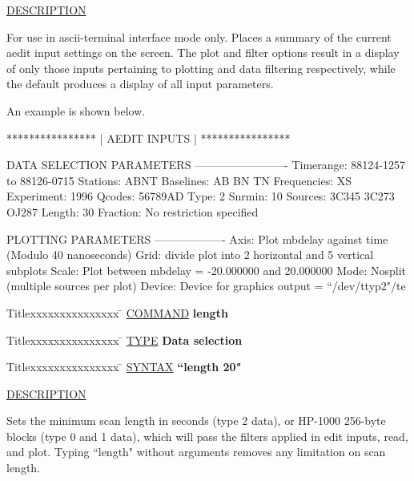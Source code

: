 \underline{DESCRIPTION}
\begin{list}{}{\setlength{\leftmargin}{0.5in}
     \setlength{\rightmargin}{0in}}
\item
For use in ascii-terminal interface mode only.  Places a
summary of the current aedit input settings on the screen.
The plot and filter options result in a display of only 
those inputs pertaining to plotting and data filtering
respectively, while the default produces a display of all
input parameters.
\item
An example is shown below.
\item
	****************
	| AEDIT INPUTS |
	****************
\item
DATA SELECTION PARAMETERS
-------------------------
Timerange:   88124-1257 to  88126-0715
Stations:    ABNT
Baselines:   AB BN TN 
Frequencies: XS
Experiment:  1996
Qcodes:      56789AD
Type:        2
Snrmin:      10
Sources:     3C345 3C273 OJ287
Length:      30 
Fraction:    No restriction specified
\item
PLOTTING PARAMETERS
-------------------
Axis:        Plot mbdelay against time (Modulo 40 nanoseconds)
Grid:        divide plot into 2 horizontal and 5 vertical subplots
Scale:       Plot between mbdelay = -20.000000 and 20.000000
Mode:        Nosplit (multiple sources per plot)
Device:      Device for graphics output = ``/dev/ttyp2"/te
\item
\end{list}
\vspace{.2in}

\begin{tabbing}
Titlexxxxxxxxxxxxxxx \= \kill
\underline{COMMAND} \> {\bf 	length} \\
\end{tabbing}

\begin{tabbing}
Titlexxxxxxxxxxxxxxx \= \kill
\underline{TYPE} \> {\bf 		Data selection} \\
\end{tabbing}

\begin{tabbing}
Titlexxxxxxxxxxxxxxx \= \kill
\underline{SYNTAX} \> {\bf 		``length 20"} \\
\end{tabbing}

\underline{DESCRIPTION}
\begin{list}{}{\setlength{\leftmargin}{0.5in}
     \setlength{\rightmargin}{0in}}
\item
Sets the minimum scan length in seconds (type 2 data),
or HP-1000 256-byte blocks (type 0 and 1 data), 
which will pass the filters applied in edit inputs, 
read, and plot.  Typing ``length" without arguments 
removes any limitation on scan length.
\end{list}
\vspace{.2in}

